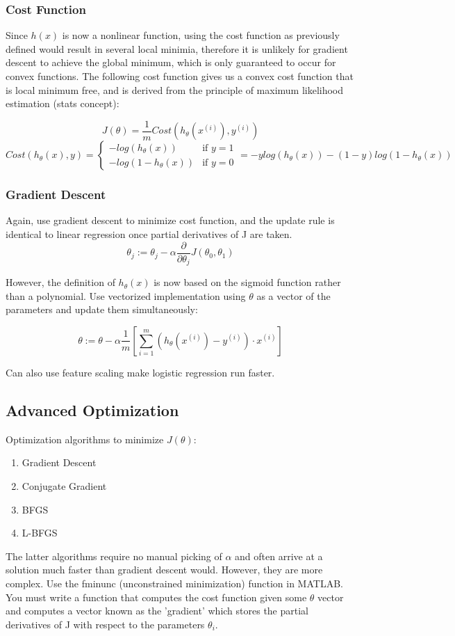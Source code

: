 \documentclass[11pt,letterpaper]{article}
\begin{document}
\subsubsection{Cost Function}
Since $h(x)$ is now a nonlinear function, using the cost function as previously defined would result in several local minimia, therefore it is unlikely for gradient descent to achieve the global minimum, which is only guaranteed to occur for convex functions. The following cost function gives us a convex cost function that is local minimum free, and is derived from the principle of maximum likelihood estimation (stats concept):
 

$$ J(\theta) = \frac{1}{m} Cost(h_\theta(x^{(i)}),y^{(i)}) $$
\[ 
Cost(h_\theta(x),y) =
\begin{cases}
      -log(h_\theta(x)) & \textrm{if } y = 1\\
      -log(1 - h_\theta(x)) & \textrm{if } y = 0
\end{cases}
= -ylog(h_\theta(x)) - (1-y)log(1-h_\theta(x))
\]

\subsubsection{Gradient Descent}
Again, use gradient descent to minimize cost function, and the update rule is identical to linear regression once partial derivatives of J are taken.
$$\theta_j := \theta_j - \alpha \frac{\partial}{\partial \theta_j} J(\theta_0, \theta_1)$$

However, the definition of $h_\theta(x)$ is now based on the sigmoid function rather than a polynomial. Use vectorized implementation using $\theta$ as a vector of the parameters and update them simultaneously:

$$\theta := \theta - \alpha \frac{1}{m}[\sum_{i=1}^{m}( h_\theta(x^{(i)})-y^{(i)}) \cdot x^{(i)}] $$

Can also use feature scaling make logistic regression run faster.

\subsection{Advanced Optimization}
Optimization algorithms to minimize $J(\theta)$:
\begin{enumerate}
	\item Gradient Descent
	\item Conjugate Gradient
	\item BFGS
	\item L-BFGS
\end{enumerate}
The latter algorithms require no manual picking of $\alpha$ and often arrive at a solution much faster than gradient descent would. However, they are more complex. Use the fminunc (unconstrained minimization) function in MATLAB. You must write a function that computes the cost function given some $\theta$ vector and computes a vector known as the 'gradient' which stores the partial derivatives of J with respect to the parameters $\theta_i$.
\end{document}
